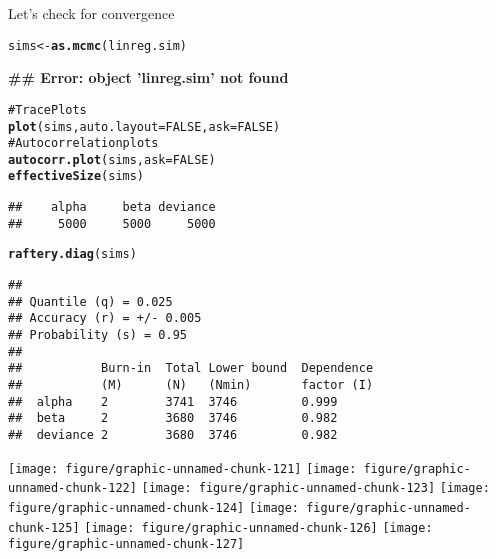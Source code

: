 \documentclass[12pt,letterpaper,oneside]{article}\usepackage{graphicx, color}
\makeatletter
\newcommand{\hlfunctioncall}[1]{\textcolor[rgb]{0.501960784313725,0,0.329411764705882}{\textbf{#1}}}%
\newcommand{\hlcomment}[1]{\textcolor[rgb]{0.180392156862745,0.6,0.341176470588235}{#1}}%
\newenvironment{kframe}{%
 \def\at@end@of@kframe{}%
 \ifinner\ifhmode%
  \def\at@end@of@kframe{\end{minipage}}%
  \begin{minipage}{\columnwidth}%
 \fi\fi%
 \def\FrameCommand##1{\hskip\@totalleftmargin \hskip-\fboxsep
 \colorbox{shadecolor}{##1}\hskip-\fboxsep
     \hskip-\linewidth \hskip-\@totalleftmargin \hskip\columnwidth}%
 \MakeFramed {\advance\hsize-\width
   \@totalleftmargin\z@ \linewidth\hsize
   \@setminipage}}%
 {\par\unskip\endMakeFramed%
 \at@end@of@kframe}
\newenvironment{knitrout}{}{} %
\makeatother
\begin{document}
Let's check for convergence
\begin{knitrout}\scriptsize
{}\color{fgcolor}\begin{kframe}
\begin{alltt}
sims <- \hlfunctioncall{as.mcmc}(linreg.sim)
\end{alltt}


{\ttfamily\noindent\bfseries\textcolor{errorcolor}{\#\# Error: object 'linreg.sim' not found}}\begin{alltt}
\hlcomment{# Trace Plots}
\hlfunctioncall{plot}(sims, auto.layout = FALSE, ask = FALSE)
\hlcomment{# Autocorrelation plots}
\hlfunctioncall{autocorr.plot}(sims, ask = FALSE)
\hlfunctioncall{effectiveSize}(sims)
\end{alltt}
\begin{verbatim}
##    alpha     beta deviance 
##     5000     5000     5000
\end{verbatim}
\begin{alltt}
\hlfunctioncall{raftery.diag}(sims)
\end{alltt}
\begin{verbatim}
## 
## Quantile (q) = 0.025
## Accuracy (r) = +/- 0.005
## Probability (s) = 0.95 
##                                                 
##           Burn-in  Total Lower bound  Dependence
##           (M)      (N)   (Nmin)       factor (I)
##  alpha    2        3741  3746         0.999     
##  beta     2        3680  3746         0.982     
##  deviance 2        3680  3746         0.982
\end{verbatim}
\end{kframe}

{\centering \texttt{[image: figure/graphic-unnamed-chunk-121]} 
\texttt{[image: figure/graphic-unnamed-chunk-122]} 
\texttt{[image: figure/graphic-unnamed-chunk-123]} 
\texttt{[image: figure/graphic-unnamed-chunk-124]} 
\texttt{[image: figure/graphic-unnamed-chunk-125]} 
\texttt{[image: figure/graphic-unnamed-chunk-126]} 
\texttt{[image: figure/graphic-unnamed-chunk-127]} 

}



\end{knitrout}
\end{document}
